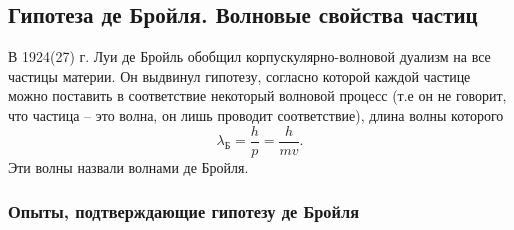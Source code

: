 \subsection{Гипотеза де Бройля. Волновые свойства частиц}

В 1924(27) г. Луи де Бройль обобщил корпускулярно-волновой дуализм на все
частицы материи. Он выдвинул гипотезу, согласно которой каждой частице можно
поставить в соответствие некоторый волновой процесс (т.е он не говорит, что
частица -- это волна, он лишь проводит соответствие), длина волны которого
\[
    \lambda_\text{Б} = \frac{h}{p} = \frac{h}{mv}.
\]
Эти волны назвали волнами де Бройля.

\subsubsection{Опыты, подтверждающие гипотезу де Бройля}
